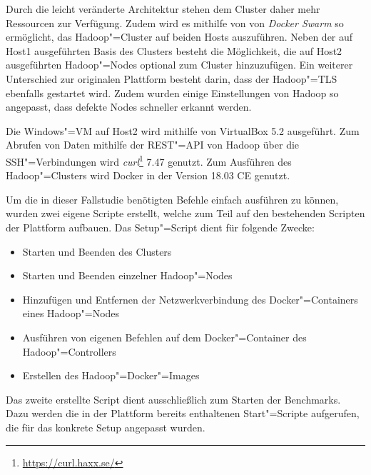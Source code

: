 Durch die leicht veränderte Architektur stehen dem Cluster daher mehr Ressourcen zur Verfügung.
Zudem wird es mithilfe von von \emph{Docker Swarm} so ermöglicht, das Hadoop"=Cluster auf beiden Hosts auszuführen.
Neben der auf Host1 ausgeführten Basis des Clusters besteht die Möglichkeit, die auf Host2 ausgeführten Hadoop"=Nodes optional zum Cluster hinzuzufügen.
Ein weiterer Unterschied zur originalen Plattform besteht darin, dass der Hadoop"=\ac{TLS} ebenfalls gestartet wird.
Zudem wurden einige Einstellungen von Hadoop so angepasst, dass defekte Nodes schneller erkannt werden.

Die Windows"=VM auf Host2 wird mithilfe von VirtualBox 5.2 ausgeführt.
Zum Abrufen von Daten mithilfe der REST"=API von Hadoop über die SSH"=Verbindungen wird \emph{curl}\footnote{\url{https://curl.haxx.se/}} 7.47 genutzt.
Zum Ausführen des Hadoop"=Clusters wird Docker in der Version 18.03 CE genutzt.

Um die in dieser Fallstudie benötigten Befehle einfach ausführen zu können, wurden zwei eigene Scripte erstellt, welche zum Teil auf den bestehenden Scripten der Plattform aufbauen.
Das Setup"=Script dient für folgende Zwecke:

\begin{itemize}
    \item Starten und Beenden des Clusters
    \item Starten und Beenden einzelner Hadoop"=Nodes
    \item Hinzufügen und Entfernen der Netzwerkverbindung des Docker"=Containers eines Hadoop"=Nodes
    \item Ausführen von eigenen Befehlen auf dem Docker"=Container des Hadoop"=Controllers
    \item Erstellen des Hadoop"=Docker"=Images
\end{itemize}

Das zweite erstellte Script dient ausschließlich zum Starten der Benchmarks.
Dazu werden die in der Plattform bereits enthaltenen Start"=Scripte aufgerufen, die für das konkrete Setup angepasst wurden.
